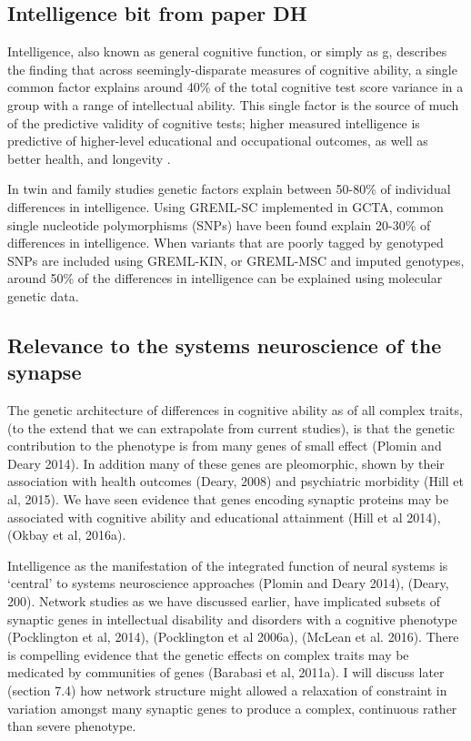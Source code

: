 \subsection{Intelligence bit from paper DH}
\label{sec:Introduction intelligence bit from paper david hill}
Intelligence, also known as general cognitive function,\cite{davies2015genetic} or simply as g,\cite{spearman1961general} describes the finding that across seemingly-disparate measures of cognitive ability, a single common factor explains around 40\% of the total cognitive test score variance in a group with a range of intellectual ability.  \cite{carroll1993human}  This single factor is the source of much of the predictive validity of cognitive tests; higher measured intelligence is predictive of higher-level educational and occupational outcomes, \cite{strenze2007intelligence}  as well as better health, and longevity .\cite{deary2012annrev} 

In twin and family studies genetic factors explain between 50-80\% of individual differences in intelligence. Using GREML-SC implemented in GCTA, \cite{yang2011gcta}  common single nucleotide polymorphisms (SNPs) have been found explain 20-30\% \cite{marioni2014common}  of differences in intelligence. When variants that are poorly tagged by genotyped SNPs are included using GREML-KIN, \cite{xia2016pedigree}  or GREML-MSC and imputed genotypes, around 50\% of the differences in intelligence can be explained using molecular genetic data. \cite{hill2018genomic} 
\subsection{Relevance to the systems neuroscience of the synapse}

The genetic architecture of differences in cognitive ability as of all complex traits, (to the extend that we can extrapolate from current studies), is that the genetic contribution to the phenotype is from many genes of small effect (Plomin and Deary 2014). In addition many of these genes are pleomorphic, shown by their association with health outcomes (Deary, 2008) and psychiatric morbidity (Hill et al, 2015). We have seen evidence that genes encoding synaptic proteins may be associated with cognitive ability and educational attainment (Hill et al 2014), (Okbay et al, 2016a).

Intelligence as the manifestation of the integrated function of neural systems is ‘central’ to systems neuroscience approaches (Plomin and Deary 2014), (Deary, 200). Network studies as we have discussed earlier, have implicated subsets of synaptic genes in intellectual disability and disorders with a cognitive phenotype (Pocklington et al, 2014), (Pocklington et al 2006a), (McLean et al. 2016). There is compelling evidence that the genetic effects on complex traits may be medicated by communities of genes (Barabasi et al, 2011a). I will discuss later (section 7.4) how network structure might allowed a relaxation of constraint in variation amongst many synaptic genes to produce a complex, continuous rather than severe phenotype.

